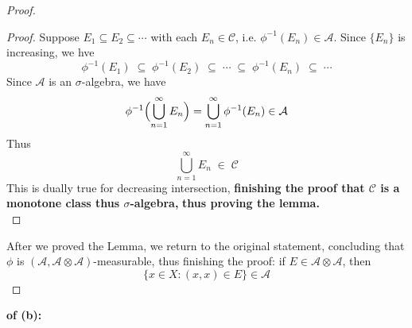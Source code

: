\documentclass[lang=cn,11pt]{elegantbook}
\begin{document}
\begin{proof}
\begin{proof}
Suppose \(E_1 \subseteq E_2 \subseteq \cdots\) with each \(E_n \in \mathcal{C}\), i.e. $\phi^{-1}(E_n) \in \mathcal{A}$.
Since \(\{E_n\}\) is increasing, we hve
\[
  \phi^{-1}(E_1) \;\subseteq\; \phi^{-1}(E_2) \;\subseteq\; \cdots \;\subseteq\; \phi^{-1}(E_n) \;\subseteq\; \cdots
\]
Since \(\mathcal{A}\) is an \(\sigma\)-algebra, we have \[
  \phi^{-1}\Bigl(\bigcup_{n=1}^\infty E_n\Bigr) = 
  \bigcup_{n=1}^\infty \phi^{-1}(E_n) \in\mathcal{A}
\]Thus \[
   \bigcup_{n=1}^\infty E_n \;\in\; \mathcal{C}
\]
This is dually true for decreasing intersection, \textbf{finishing the proof that $\mathcal{C}$ is a monotone class thus $\sigma$-algebra,} \textbf{thus proving the lemma.}\\
\end{proof}
After we proved the Lemma, we return to the original statement, concluding that $\phi$ is $(\mathcal{A},\mathcal{A}\otimes \mathcal{A})$-measurable, thus finishing the proof: if $E\in\mathcal{A}\otimes\mathcal{A}$, then  \[
      \{ x\in X: (x,x)\in E\} \in \mathcal{A}
    \]
\end{proof}



\begin{solution}
    \textbf{of (b):}\\
\end{solution}
\end{document}
